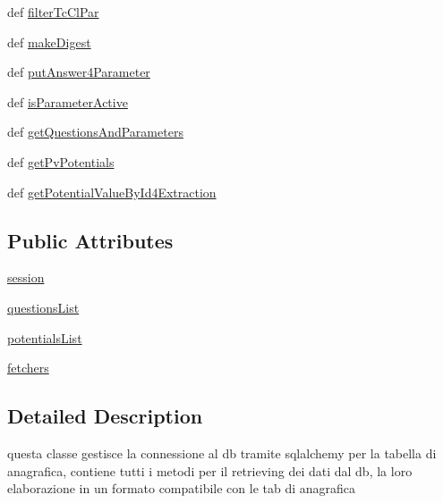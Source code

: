 \begin{DoxyCompactItemize}
\item 
def \hyperlink{classmmasgis_1_1AnagraficaDb_1_1tableDb_a699b86a64fe91b62dfced891546008c7}{filterTcClPar}
\item 
def \hyperlink{classmmasgis_1_1AnagraficaDb_1_1tableDb_afdbc73d23a1213153342a6f7a81a7be6}{makeDigest}
\item 
def \hyperlink{classmmasgis_1_1AnagraficaDb_1_1tableDb_a8df75ad112f04bc6b1b073aafca874a4}{putAnswer4Parameter}
\item 
def \hyperlink{classmmasgis_1_1AnagraficaDb_1_1tableDb_a77b90f0b66fcfc71a1b1729fedf99099}{isParameterActive}
\item 
def \hyperlink{classmmasgis_1_1AnagraficaDb_1_1tableDb_ac69809dcd3f98c1fcdb28047be8534f4}{getQuestionsAndParameters}
\item 
def \hyperlink{classmmasgis_1_1AnagraficaDb_1_1tableDb_afa1fb2d086d4d21e86f3b67f7c1286c9}{getPvPotentials}
\item 
def \hyperlink{classmmasgis_1_1AnagraficaDb_1_1tableDb_a0698751475b1a6b388a603431f515e51}{getPotentialValueById4Extraction}
\end{DoxyCompactItemize}
\subsection*{Public Attributes}
\begin{DoxyCompactItemize}
\item 
\hyperlink{classmmasgis_1_1AnagraficaDb_1_1tableDb_a0ede4547d8a1c6d29dbef0f8b96576b1}{session}
\item 
\hyperlink{classmmasgis_1_1AnagraficaDb_1_1tableDb_a73fc92d28817b9cce749750e4c279819}{questionsList}
\item 
\hyperlink{classmmasgis_1_1AnagraficaDb_1_1tableDb_a9ee7b6c91b08f996816bd29e3c522fa5}{potentialsList}
\item 
\hyperlink{classmmasgis_1_1AnagraficaDb_1_1tableDb_ae7b071b84e8756382e05eace8de17de4}{fetchers}
\end{DoxyCompactItemize}


\subsection{Detailed Description}
\begin{DoxyVerb}
questa classe gestisce la connessione al db tramite sqlalchemy per la tabella di anagrafica,
 contiene tutti i metodi per il retrieving dei dati dal db, la loro elaborazione in un formato compatibile con le tab di anagrafica 
\end{DoxyVerb}
 


